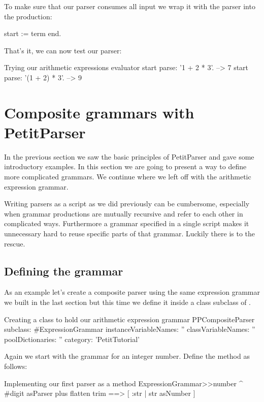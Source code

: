 \documentclass[a4paper,10pt,twoside]{book}
\begin{document}
To make sure that our parser consumes all input we wrap it with the
 parser into the  production:

\begin{code}{}
start := term end.
\end{code}

That's it, we can now test our parser:

\begin{script}{Trying our arithmetic expressions evaluator}
start parse: '1 + 2 * 3'.       --> 7
start parse: '(1 + 2) * 3'.     --> 9
\end{script}

\section{Composite grammars with PetitParser}

In the previous section we saw the basic principles of PetitParser and
gave some introductory examples. In this section we are going to
present a way to define more complicated grammars. We continue where
we left off with the arithmetic expression grammar.

Writing parsers as a script as we did previously can be cumbersome,
especially when grammar productions are mutually recursive and refer
to each other in complicated ways. Furthermore a grammar specified in
a single script makes it unnecessary hard to reuse specific parts of
that grammar. Luckily there is  to the rescue.

\subsection{Defining the grammar}

As an example let's create a composite parser using the same
expression grammar we built in the last section but this time we define
it inside a  class subclass of .

\begin{script}{Creating a class to hold our arithmetic expression grammar}
PPCompositeParser subclass: #ExpressionGrammar
   instanceVariableNames: ''
   classVariableNames: ''
   poolDictionaries: ''
   category: 'PetitTutorial'
\end{script}

Again we start with the grammar for an integer number. Define the
method  as follows:

\begin{script}{Implementing our first parser as a method}
ExpressionGrammar>>number
   ^ #digit asParser plus flatten trim ==> [ :str | str asNumber ]
\end{script}
\end{document}
